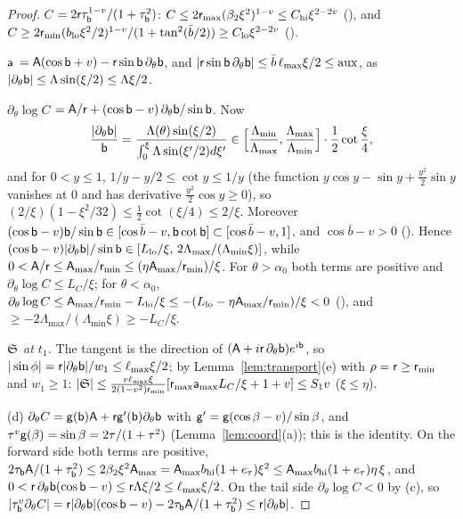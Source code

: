\begin{proof}
\emph{$C$} $=2\mathsf r\tau_{\mathsf b}^{1-v}/(1+\tau_{\mathsf b}^2)$: $C\le2\mathsf r_{\max}(\beta_2\xi^2)^{1-v}\le C_{\mathrm{hi}}\xi^{2-2v}$ (), and
$C\ge2\mathsf r_{\min}(b_{\mathrm{lo}}\xi^2/2)^{1-v}/(1+\tan^2(\bar b/2))\ge C_{\mathrm{lo}}\xi^{2-2v}$ ().

\emph{$\mathsf a$} $=\mathsf A(\cos\mathsf b+v)-\mathsf r\sin\mathsf b\,\partial_\theta\mathsf b$, and $|\mathsf r\sin\mathsf b\,\partial_\theta\mathsf b|\le\bar b\,\ell_{\max}\xi/2\le\mathrm{aux}$, as
$|\partial_\theta\mathsf b|\le\Lambda\sin(\xi/2)\le\Lambda\xi/2$.

\emph{$\partial_\theta\log C$} $=\mathsf A/\mathsf r+(\cos\mathsf b-v)\,\partial_\theta\mathsf b/\sin\mathsf b$. Now
\[
\frac{|\partial_\theta\mathsf b|}{\mathsf b}=\frac{\Lambda(\theta)\sin(\xi/2)}{\int_0^\xi\Lambda\sin(\xi'/2)d\xi'}\in
\Bigl[\frac{\Lambda_{\min}}{\Lambda_{\max}},\frac{\Lambda_{\max}}{\Lambda_{\min}}\Bigr]\cdot\frac12\cot\frac\xi4,
\]
and for $0<y\le1$, $1/y-y/2\le\cot y\le1/y$ (the function $y\cos y-\sin y+\frac{y^2}2\sin y$ vanishes at $0$ and has derivative
$\frac{y^2}2\cos y\ge0$), so $(2/\xi)(1-\xi^2/32)\le\frac12\cot(\xi/4)\le2/\xi$. Moreover
$(\cos\mathsf b-v)\mathsf b/\sin\mathsf b\in[\cos\bar b-v,\mathsf b\cot\mathsf b]\subset[\cos\bar b-v,1]$, and $\cos\bar b-v>0$ (). Hence
$(\cos\mathsf b-v)|\partial_\theta\mathsf b|/\sin\mathsf b\in[L_{\mathrm{lo}}/\xi,\,2\Lambda_{\max}/(\Lambda_{\min}\xi)]$, while
$0<\mathsf A/\mathsf r\le\mathsf A_{\max}/\mathsf r_{\min}\le(\eta\mathsf A_{\max}/\mathsf r_{\min})/\xi$. For $\theta>\alpha_0$ both terms are positive and
$\partial_\theta\log C\le L_C/\xi$; for $\theta<\alpha_0$, $\partial_\theta\log C\le\mathsf A_{\max}/\mathsf r_{\min}-L_{\mathrm{lo}}/\xi\le
-(L_{\mathrm{lo}}-\eta\mathsf A_{\max}/\mathsf r_{\min})/\xi<0$ (), and $\ge-2\Lambda_{\max}/(\Lambda_{\min}\xi)\ge-L_C/\xi$.

\emph{$\mathfrak S$ at $t_1$.} The tangent is the direction of $(\mathsf A+i\mathsf r\,\partial_\theta\mathsf b)e^{i\mathsf b}$, so $|\sin\phi|=\mathsf r|\partial_\theta\mathsf b|/w_1\le\ell_{\max}\xi/2$;
by Lemma~\ref{lem:transport}(e) with $\rho=\mathsf r\ge\mathsf r_{\min}$ and $w_1\ge1$:
$|\mathfrak S|\le\frac{v\ell_{\max}\xi}{2(1-v^2)\mathsf r_{\min}}[\mathsf r_{\max}\mathsf a_{\max}L_C/\xi+1+v]\le S_1v$ ($\xi\le\eta$).

(d) $\partial_\theta C=\mathsf g(\mathsf b)\mathsf A+\mathsf r\mathsf g'(\mathsf b)\partial_\theta\mathsf b$ with $\mathsf g'=\mathsf g(\cos\beta-v)/\sin\beta$, and $\tau^v\mathsf g(\beta)=\sin\beta=2\tau/(1+\tau^2)$
(Lemma~\ref{lem:coord}(a)); this is the identity. On the forward side both terms are positive,
$2\tau_{\mathsf b}\mathsf A/(1+\tau_{\mathsf b}^2)\le2\beta_2\xi^2\mathsf A_{\max}=\mathsf A_{\max}b_{\mathrm{hi}}(1+e_\tau)\xi^2\le\mathsf A_{\max}b_{\mathrm{hi}}(1+e_\tau)\eta\,\xi$, and
$0<\mathsf r\,\partial_\theta\mathsf b(\cos\mathsf b-v)\le\mathsf r\Lambda\xi/2\le\ell_{\max}\xi/2$. On the tail side $\partial_\theta\log C<0$ by (c), so
$|\tau_{\mathsf b}^v\partial_\theta C|=\mathsf r|\partial_\theta\mathsf b|(\cos\mathsf b-v)-2\tau_{\mathsf b}\mathsf A/(1+\tau_{\mathsf b}^2)\le\mathsf r|\partial_\theta\mathsf b|$.
\end{proof}

